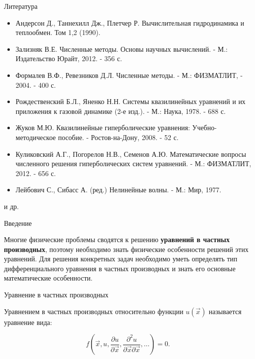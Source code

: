 \documentclass[10pt,xcolor=pst,aspectratio=169]{beamer}
\begin{document}
\begin{frame}{Литература}

	\transdissolve[duration=0.1]

    \begin{itemize}
        \item Андерсон Д., Таннехилл Дж., Плетчер Р. Вычислительная гидродинамика и теплообмен. Том 1,2 (1990).

        \item Зализняк В.Е. Численные методы. Основы научных вычислений. - М.: Издательство Юрайт, 2012. - 356 с.

        \item Формалев В.Ф., Ревезников Д.Л. Численные методы. - М.: ФИЗМАТЛИТ, - 2004. - 400 с.

        \item Рождественский Б.Л., Яненко Н.Н. Системы квазилинейных уравнений и их приложения к газовой динамике (2-е изд.). - М.: Наука, 1978. - 688 с.
        
        \item Жуков М.Ю. Квазилинейные гиперболические уравнения: Учебно-методическое пособие. - Ростов-на-Дону, 2008. - 52 с.

        \item Куликовский А.Г., Погорелов Н.В., Семенов А.Ю. Математические вопросы численного решения гиперболических систем уравнений. - М.: ФИЗМАТЛИТ, 2012. - 656 с.

        \item Лейбович С., Сибасс А. (ред.) Нелинейные волны. - М.: Мир, 1977.
    \end{itemize}

    и др.

\end{frame}

\begin{frame}{Введение}

	\transdissolve[duration=0.1]
	\justifying
	\large

	Многие физические проблемы сводятся к решению \textbf{уравнений в частных производных}, поэтому необходимо знать физические особенности решений этих уравнений. Для решения конкретных задач необходимо уметь определять тип дифференциального уравнения в частных производных и знать его основные математические особенности.

\end{frame}

\begin{frame}{Уравнение в частных производных}

	\transdissolve[duration=0.1]
	\justifying
	\large

	Уравнением в частных производных относительно функции $u \left( \vec{x} \right)$ называется уравнение вида:

	\[
		f \left( \vec{x}, u, \frac{\partial u}{\partial \vec{x}}, \frac{\partial^{2} u}{\partial \vec{x} \partial \vec{x}}, \ldots \right) = 0.
	\]

\end{frame}
\end{document}
